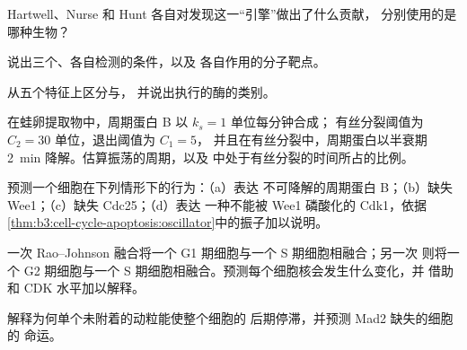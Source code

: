 \begin{exercise}[$\star$]\label{exo:b3:cell-cycle-apoptosis:2}
Hartwell、Nurse 和 Hunt 各自对发现这一“引擎”做出了什么贡献，
分别使用的是哪种生物？
\end{exercise}

\begin{exercise}[$\star$]\label{exo:b3:cell-cycle-apoptosis:3}
说出三个、各自检测的条件，以及
各自作用的分子靶点。
\end{exercise}

\begin{exercise}[$\star$]\label{exo:b3:cell-cycle-apoptosis:4}
从五个特征上区分与，
并说出执行的酶的类别。
\end{exercise}

\begin{exercise}[$\star\star$]\label{exo:b3:cell-cycle-apoptosis:5}
在蛙卵提取物中，周期蛋白 B 以 $k_{s} = 1$ 单位每分钟合成；
有丝分裂阈值为 $C_{2} = 30$ 单位，退出阈值为 $C_{1} = 5$，
并且在有丝分裂中，周期蛋白以半衰期
\qty{2}{min} 降解。估算振荡的周期，以及
中处于有丝分裂的时间所占的比例。
\end{exercise}

\begin{exercise}[$\star\star$]\label{exo:b3:cell-cycle-apoptosis:6}
预测一个细胞在下列情形下的行为：（a）表达
不可降解的周期蛋白 B；（b）缺失 Wee1；（c）缺失 Cdc25；（d）表达
一种不能被 Wee1 磷酸化的 Cdk1，依据
\cref{thm:b3:cell-cycle-apoptosis:oscillator}中的振子加以说明。
\end{exercise}

\begin{exercise}[$\star\star$]\label{exo:b3:cell-cycle-apoptosis:7}
一次 Rao--Johnson 融合将一个 G1 期细胞与一个 S 期细胞相融合；另一次
则将一个 G2 期细胞与一个 S 期细胞相融合。预测每个细胞核会发生什么变化，并
借助和 CDK 水平加以解释。
\end{exercise}

\begin{exercise}[$\star\star$]\label{exo:b3:cell-cycle-apoptosis:8}
解释为何单个未附着的动粒能使整个细胞的
后期停滞，并预测 Mad2 缺失的细胞的
命运。
\end{exercise}

